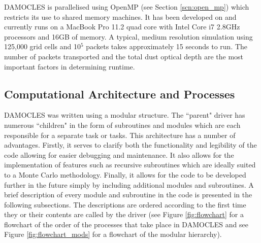        DAMOCLES is parallelised using OpenMP (see Section \ref{scn:open_mp}) which restricts its use to shared memory machines.  It has been developed on and currently runs on a MacBook Pro 11.2 quad core with Intel Core i7 2.8GHz processors and 16GB of memory.  A typical, medium resolution simulation using 125,000 grid cells and 10$^5$ packets takes approximately 15 seconds to run.  The number of packets transported and the total dust optical depth are the most important factors in determining runtime.  	

        
        \subsection{Computational Architecture and Processes}
        DAMOCLES was written using a modular structure.  The ``parent" driver has numerous ``children" in the form of subroutines and modules which are each responsible for a separate task or tasks.  This architecture has a number of advantages.  Firstly, it serves to clarify both the functionality and legibility of the code allowing for easier debugging and maintenance.  It also allows for the implementation of features such as recursive subroutines which are ideally suited to a Monte Carlo methodology.  Finally, it allows for the code to be developed further in the future simply by including additional modules and subroutines.  A brief description of every module and subroutine in the code is presented in the following subsections.  The descriptions are ordered according to the first time they or their contents are called by the driver (see Figure \ref{fig:flowchart} for a flowchart of the order of the processes that take place in DAMOCLES and see Figure \ref{fig:flowchart_mods} for a flowchart of the modular hierarchy).
        

